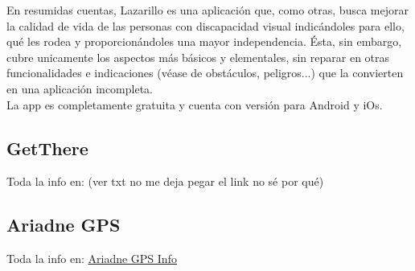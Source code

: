 \documentclass{article}
\begin{document}
	En resumidas cuentas, Lazarillo es una aplicación que, como otras, busca mejorar la calidad de vida de las personas con discapacidad visual indicándoles para ello, qué les rodea y proporcionándoles una mayor independencia. Ésta, sin embargo, cubre unicamente los aspectos más básicos y elementales, sin reparar en otras funcionalidades e indicaciones (véase de obstáculos, peligros...) que la convierten en una aplicación incompleta.
	\\
	La app es completamente gratuita y cuenta con versión para Android y iOs.
	
	
	
	
	\subsection{GetThere}
	Toda la info en: (ver txt no me deja pegar el link no sé por qué)
	 
	
	\subsection{Ariadne GPS}
	Toda la info en:
	\textcolor{blue}{\href{http://www.ariadnegps.eu/}{Ariadne GPS Info}}
 
	
\end{document}
